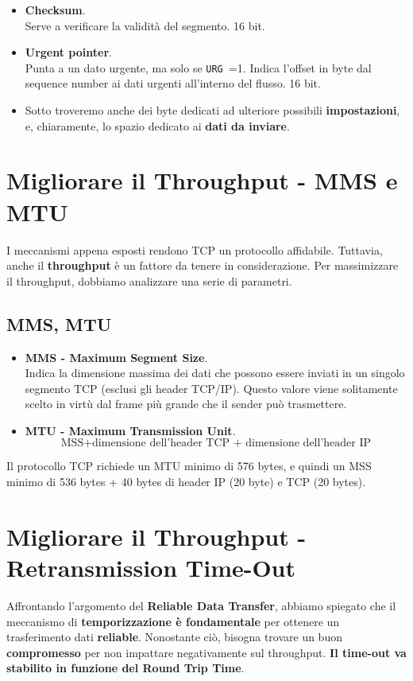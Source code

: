 \begin{itemize}
	\item \textbf{Checksum}.\\
	Serve a verificare la validità del segmento. 16 bit.
	
	\item \textbf{Urgent pointer}.\\
	Punta a un dato urgente, ma solo se \verb|URG |=1. Indica l'offset in byte dal sequence number ai dati urgenti all'interno del flusso. 16 bit.
	
	\item Sotto troveremo anche dei byte dedicati ad ulteriore possibili \textbf{impostazioni}, e, chiaramente, lo spazio dedicato ai \textbf{dati da inviare}.
\end{itemize}


\newpage

\section{Migliorare il Throughput - MMS e MTU}
I meccanismi appena esposti rendono TCP un protocollo affidabile. Tuttavia, anche il \textbf{throughput} è un fattore da tenere in considerazione. Per massimizzare il throughput, dobbiamo analizzare una serie di parametri.

\subsection{MMS, MTU}
\begin{itemize}
	\item \textbf{MMS - Maximum Segment Size}.\\
	Indica la dimensione massima dei dati che possono essere inviati in un singolo segmento TCP (esclusi gli header TCP/IP). Questo valore viene solitamente scelto in virtù dal frame più grande che il sender può trasmettere. 
	
	\item \textbf{MTU - Maximum Transmission Unit}.
	$$\text{MSS} + \text{dimensione dell'header TCP + dimensione dell'header IP}$$
	
\end{itemize}

Il protocollo TCP richiede un MTU minimo di 576 bytes, e quindi un MSS minimo di 536 bytes + 40 bytes di header IP (20 byte) e TCP (20 bytes).

\section{Migliorare il Throughput - Retransmission Time-Out}
Affrontando l'argomento del \textbf{Reliable Data Transfer}, abbiamo spiegato che il meccanismo di \textbf{temporizzazione è fondamentale} per ottenere un trasferimento dati \textbf{reliable}. Nonostante ciò, bisogna trovare un buon \textbf{compromesso} per non impattare negativamente sul throughput. \textbf{Il time-out va stabilito in funzione del Round Trip Time}.

